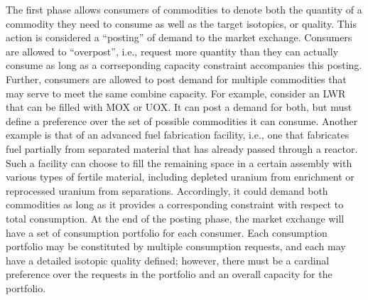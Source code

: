 The first phase allows consumers of commodities to denote both the quantity of a
commodity they need to consume as well as the target isotopics, or quality. This
action is considered a ``posting'' of demand to the market exchange. Consumers
are allowed to ``overpost'', i.e., request more quantity than they can actually
consume as long as a corrseponding capacity constraint accompanies this
posting. Further, consumers are allowed to post demand for multiple commodities
that may serve to meet the same combine capacity. For example, consider an LWR
that can be filled with MOX or UOX. It can post a demand for both, but must
define a preference over the set of possible commodities it can consume. Another
example is that of an advanced fuel fabrication facility, i.e., one that
fabricates fuel partially from separated material that has already passed
through a reactor. Such a facility can choose to fill the remaining space in a
certain assembly with various types of fertile material, including depleted
uranium from enrichment or reprocessed uranium from separations. Accordingly, it
could demand both commodities as long as it provides a corresponding constraint
with respect to total consumption. At the end of the posting phase, the market
exchange will have a set of consumption portfolio for each consumer. Each
consumption portfolio may be constituted by multiple consumption requests, and
each may have a detailed isotopic quality defined; however, there must be a
cardinal preference over the requests in the portfolio and an overall capacity
for the portfolio. 


